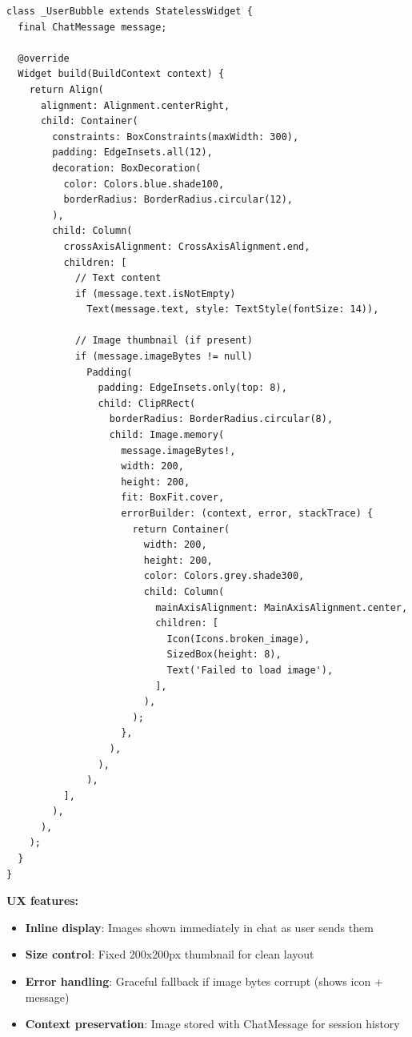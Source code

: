 \begin{lstlisting}[caption={Image Display in Chat Bubbles --- chat\_bubble.dart}]
class _UserBubble extends StatelessWidget {
  final ChatMessage message;
  
  @override
  Widget build(BuildContext context) {
    return Align(
      alignment: Alignment.centerRight,
      child: Container(
        constraints: BoxConstraints(maxWidth: 300),
        padding: EdgeInsets.all(12),
        decoration: BoxDecoration(
          color: Colors.blue.shade100,
          borderRadius: BorderRadius.circular(12),
        ),
        child: Column(
          crossAxisAlignment: CrossAxisAlignment.end,
          children: [
            // Text content
            if (message.text.isNotEmpty)
              Text(message.text, style: TextStyle(fontSize: 14)),
            
            // Image thumbnail (if present)
            if (message.imageBytes != null)
              Padding(
                padding: EdgeInsets.only(top: 8),
                child: ClipRRect(
                  borderRadius: BorderRadius.circular(8),
                  child: Image.memory(
                    message.imageBytes!,
                    width: 200,
                    height: 200,
                    fit: BoxFit.cover,
                    errorBuilder: (context, error, stackTrace) {
                      return Container(
                        width: 200,
                        height: 200,
                        color: Colors.grey.shade300,
                        child: Column(
                          mainAxisAlignment: MainAxisAlignment.center,
                          children: [
                            Icon(Icons.broken_image),
                            SizedBox(height: 8),
                            Text('Failed to load image'),
                          ],
                        ),
                      );
                    },
                  ),
                ),
              ),
          ],
        ),
      ),
    );
  }
}
\end{lstlisting}

\textbf{UX features:}
\begin{itemize}
    \item \textbf{Inline display}: Images shown immediately in chat as user sends them
    \item \textbf{Size control}: Fixed 200x200px thumbnail for clean layout
    \item \textbf{Error handling}: Graceful fallback if image bytes corrupt (shows icon + message)
    \item \textbf{Context preservation}: Image stored with ChatMessage for session history
\end{itemize}

